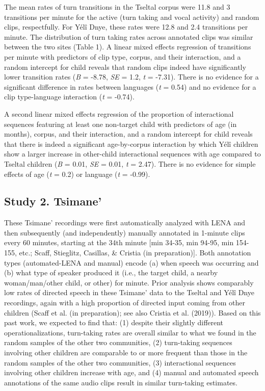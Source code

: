 \documentclass[10pt, letterpaper]{article}
\begin{document}
The mean rates of turn transitions in the Tseltal corpus were 11.8 and 3
transitions per minute for the active (turn taking and vocal activity)
and random clips, respectfully. For Yélî Dnye, these rates were 12.8 and
2.4 transitions per minute. The distribution of turn taking rates across
annotated clips was similar between the two sites (Table 1). A linear
mixed effects regression of transitions per minute with predictors of
clip type, corpus, and their interaction, and a random intercept for
child reveals that random clips indeed have significantly lower
transition rates (\emph{B} = -8.78, \emph{SE} = 1.2, \emph{t} = -7.31).
There is no evidence for a significant difference in rates between
languages (\emph{t} = 0.54) and no evidence for a clip type-language
interaction (\emph{t} = -0.74).

A second linear mixed effects regression of the proportion of
interactional sequences featuring at least one non-target child with
predictors of age (in months), corpus, and their interaction, and a
random intercept for child reveals that there is indeed a significant
age-by-corpus interaction by which Yélî children show a larger increase
in other-child interactional sequences with age compared to Tseltal
children (\emph{B} = 0.01, \emph{SE} = 0.01, \emph{t} = 2.47). There is
no evidence for simple effects of age (\emph{t} = 0.2) or language
(\emph{t} = -0.99).

\hypertarget{study-2.-tsimane}{%
\subsection{Study 2. Tsimane'}\label{study-2.-tsimane}}

These Tsimane' recordings were first automatically analyzed with LENA
and then subsequently (and independently) manually annotated in 1-minute
clips every 60 minutes, starting at the 34th minute {[}min 34-35, min
94-95, min 154-155, etc.; Scaff, Stieglitz, Casillas, \& Cristia (in
preparation){]}. Both annotation types (automated-LENA and manual)
encode (a) when speech was occurring and (b) what type of speaker
produced it (i.e., the target child, a nearby woman/man/other child, or
other) for minute. Prior analysis shows comparably low rates of directed
speech in these Tsimane' data to the Tseltal and Yélî Dnye recordings,
again with a high proportion of directed input coming from other
children (Scaff et al. (in preparation); see also Cristia et al.
(2019)). Based on this past work, we expected to find that: (1) despite
their slightly different operationalizations, turn-taking rates are
overall similar to what we found in the random samples of the other two
communities, (2) turn-taking sequences involving other children are
comparable to or more frequent than those in the random samples of the
other two communities, (3) interactional sequences involving other
children increase with age, and (4) manual and automated speech
annotations of the same audio clips result in similar turn-taking
estimates.
\end{document}
